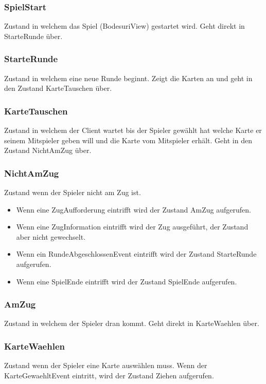 \documentclass[12pt,halfparskip]{scrartcl}
\begin{document}
\subsubsection{SpielStart} %
\label{ssub:spielstart}
Zustand in welchem das Spiel (BodesuriView) gestartet wird. Geht direkt in StarteRunde über.

\subsubsection{StarteRunde} %
\label{ssub:starterunde}
Zustand in welchem eine neue Runde beginnt. Zeigt die Karten an und geht in den Zustand KarteTauschen über.

\subsubsection{KarteTauschen} %
\label{ssub:kartetauschen}
Zustand in welchem der Client wartet bis der Spieler gewählt hat welche Karte er seinem Mitspieler geben will und die Karte vom Mitspieler erhält. Geht in den Zustand NichtAmZug über.

\subsubsection{NichtAmZug} %
\label{ssub:nichtamzug}
Zustand wenn der Spieler nicht am Zug ist.
\begin{itemize}
	\item Wenn eine ZugAufforderung eintrifft wird der Zustand AmZug aufgerufen.
	\item Wenn eine ZugInformation eintrifft wird der Zug ausgeführt, der Zustand aber nicht gewechselt.
	\item Wenn ein RundeAbgeschlossenEvent eintrifft wird der Zustand StarteRunde aufgerufen.
	\item Wenn eine SpielEnde eintrifft wird der Zustand SpielEnde aufgerufen.
\end{itemize}

\subsubsection{AmZug} %
\label{ssub:amzug}
Zustand in welchem der Spieler dran kommt. Geht direkt in KarteWaehlen über.

\subsubsection{KarteWaehlen} %
\label{ssub:kartewaehlen}
Zustand wenn der Spieler eine Karte auswählen muss. Wenn der KarteGewaehltEvent eintritt, wird der Zustand Ziehen aufgerufen.
\end{document}

